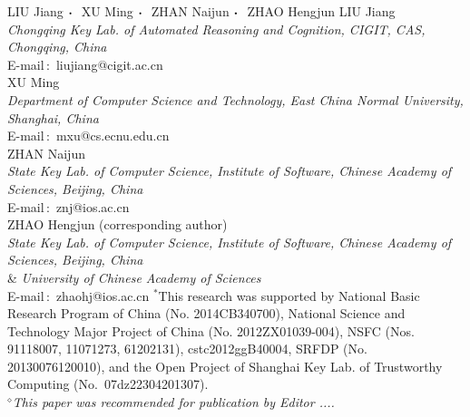 \documentclass{jssc}
\def\cdd{\mbox{\boldmath$\cdot$}~}
\begin{document}
{LIU Jiang $\cdd$ XU Ming $\cdd$ ZHAN Naijun $\cdd$ ZHAO Hengjun}%
{LIU Jiang\\
{\it Chongqing Key Lab. of Automated Reasoning and Cognition, CIGIT, CAS, Chongqing, China}\\
E-mail\,$:$ liujiang@cigit.ac.cn\\
XU Ming\\
{\it Department of Computer Science and Technology, East China Normal University, Shanghai, China}\\
E-mail\,$:$ mxu@cs.ecnu.edu.cn\\
ZHAN Naijun\\
{\it State Key Lab. of Computer Science, Institute of Software, Chinese Academy of Sciences, Beijing, China}\\
E-mail\,$:$ znj@ios.ac.cn\\
ZHAO Hengjun (corresponding author)\\
{\it State Key Lab. of Computer Science, Institute of Software, Chinese Academy of Sciences, Beijing, China}\\
\& {\it University of Chinese Academy of Sciences}\\
E-mail\,$:$ zhaohj@ios.ac.cn}
{$^*$This research was supported by National Basic Research Program of China (No. 2014CB340700), National Science and Technology Major Project of China (No. 2012ZX01039-004), NSFC (Nos. 91118007, 11071273, 61202131), cstc2012ggB40004, SRFDP (No. 20130076120010), and the Open Project of Shanghai Key Lab. of Trustworthy Computing (No.~07dz22304201307).\\
{$^\diamond${\it This paper was recommended for publication by
Editor .... }}}
\end{document}
